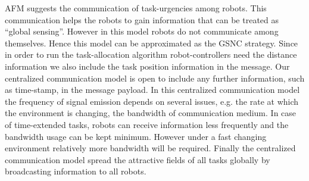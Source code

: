 \documentclass[journal]{IEEEtran}
\begin{document}
AFM suggests the communication of task-urgencies  among robots. This communication helps the robots to gain information that can be  treated as ``global sensing''. However in this model  robots do not communicate among themselves. Hence this model can be approximated as the GSNC strategy. Since in order to run the task-allocation algorithm robot-controllers need the distance information we also include the task position information in  the message. Our centralized communication model is open to include any further information, such as time-stamp, in the message payload. In this centralized communication model the frequency of signal emission depends on several issues, e.g. the rate at which the environment is changing, the bandwidth of communication medium. In case of time-extended tasks, robots can receive information less frequently and the  bandwidth usage can be kept  minimum. However under a fast changing environment relatively more bandwidth will be required.  Finally the centralized communication model spread the attractive fields of all tasks globally by broadcasting information to all robots.  
\end{document}
